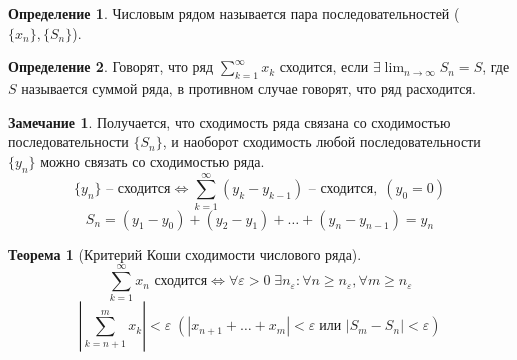 \documentclass[a4paper,oneside]{article}
\newcommand{\dslim}{\displaystyle\lim}
\newcommand{\dslimn}{\dslim_{n \to \infty}}
\newcommand{\series}[1]{\displaystyle\sum_{k=1}^\infty #1}
\newcommand{\seriesx}{\displaystyle\sum_{k=1}^\infty x_k}
\newtheorem{theorem}{Теорема}[subsection]
\theoremstyle{definition}
\newtheorem{definition}{Определение}[subsection]
\theoremstyle{definition}
\theoremstyle{definition}
\newtheorem*{remark}{Замечание}
\begin{document}
\begin{definition}
    Числовым рядом называется пара последовательностей ($\{x_n\}, \{S_n\}$).
\end{definition}

\begin{definition}
    Говорят, что ряд $\seriesx$ сходится, если $\exists \dslimn S_n = S$, где $S$ называется суммой ряда, в противном случае говорят, что ряд расходится.
\end{definition}

\begin{remark}
    Получается, что сходимость ряда связана со сходимостью последовательности $\{S_n\}$, и наоборот сходимость любой последовательности $\{y_n\}$ можно связать со сходимостью ряда.
    \[ \{y_n\}  \text{ -- сходится} \iff \series{(y_k - y_{k-1})} \text{ -- сходится}, \; (y_0 = 0) \]
    \[ S_n = (y_1 - y_0) + (y_2 - y_1) + \dots + (y_n - y_{n-1}) = y_n \]
\end{remark}

\begin{theorem}[Критерий Коши сходимости числового ряда]
    \[ \series{x_n} \text{ сходится} \iff \forall \varepsilon > 0 \; \exists n_\varepsilon \! : \forall n \geq n_\varepsilon , \forall m \geq n_\varepsilon      \]
    \[ \left| \displaystyle\sum_{k=n+1}^m x_k \right| < \varepsilon \; (|x_{n+1} + \dots + x_m| < \varepsilon \; \text{или } |S_m - S_n| < \varepsilon) \]

\end{theorem}
\end{document}
